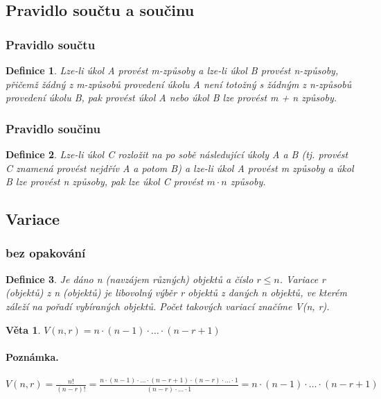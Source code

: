 \documentclass[12pt,a4paper]{article}
\newtheorem{definition}{Definice}
\newtheorem{sentence}{Věta}
\begin{document}
\subsection{Pravidlo součtu a součinu}
\subsubsection{Pravidlo součtu}
\begin{definition}
	Lze-li úkol A provést m-způsoby a lze-li úkol B provést n-způsoby,
přičemž žádný z m-způsobů provedení úkolu A není totožný s žádným z n-způsobů
provedení úkolu B, pak provést úkol A nebo úkol B lze provést m + n způsoby.
\end{definition}

\subsubsection{Pravidlo součinu}
\begin{definition}
	Lze-li úkol C rozložit na po sobě následující úkoly A a B (tj. provést
C znamená provést nejdřív A a potom B) a lze-li úkol A provést m způsoby a úkol B lze
provést n způsoby, pak lze úkol C provést $m \cdot n $ způsoby.	
\end{definition}

\subsection{Variace}
\subsubsection{bez opakování}
\begin{definition}
	Je dáno n (navzájem různých) objektů a číslo $r \leq n$. Variace r
(objektů) z n (objektů) je libovolný výběr r objektů z daných n objektů, ve kterém záleží na
pořadí vybíraných objektů. Počet takových variací značíme V(n, r).
\end{definition}
\begin{sentence}
	$V(n, r) = n \cdot (n - 1) \cdot \dots \cdot (n - r + 1)$
\end{sentence}
\paragraph{Poznámka.} $V(n, r) = \frac{n!}{(n - r)!} = \frac{n \cdot (n - 1) \cdot \dots \cdot (n - r + 1) \cdot (n - r) \cdot \dots \cdot 1}{(n - r) \cdot \dots \cdot 1} = n \cdot (n - 1) \cdot \dots \cdot (n - r + 1)$
\end{document}
